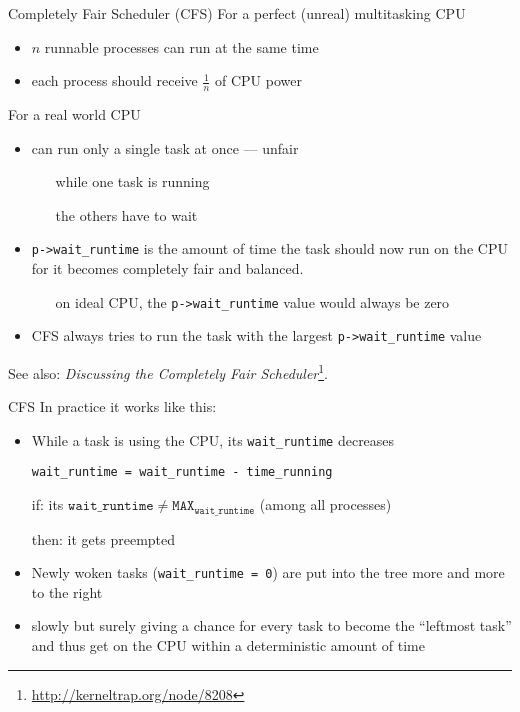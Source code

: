 \begin{frame}{Completely Fair Scheduler (CFS)}
  For a perfect (unreal) multitasking CPU
  \begin{itemize}
  \item $n$ runnable processes can run at the same time
  \item each process should receive $\frac{1}{n}$ of CPU power
  \end{itemize}
  
  For a real world CPU
  \begin{itemize}
  \item can run only a single task at once --- unfair
    \begin{itemize}
    \item[\good] while one task is running
    \item[\textcolor{red}{\bad}] the others have to wait
    \end{itemize}
  \item \texttt{p->wait\_runtime} is the amount of time the task should now run on the CPU
    for it becomes completely fair and balanced.
    \begin{itemize}
    \item[\good] on ideal CPU, the \texttt{p->wait\_runtime} value would always be zero
    \end{itemize}
  \item CFS always tries to run the task with the largest \texttt{p->wait\_runtime} value
  \end{itemize}
\end{frame}

See also: \emph{Discussing the Completely Fair
  Scheduler}\footnote{\url{http://kerneltrap.org/node/8208}}.

\begin{frame}{CFS}
  In practice it works like this:
  \begin{itemize}
  \item While a task is using the CPU, its \texttt{wait\_runtime} decreases
    \begin{center}
      \texttt{wait\_runtime = wait\_runtime - time\_running}
    \end{center}
  \item[if:] its $\mathtt{wait\_runtime \ne MAX_{wait\_runtime}}$
    (among all processes)
  \item[then:] it gets preempted
  \item Newly woken tasks (\texttt{wait\_runtime = 0}) are put into the tree more and more
    to the right
  \item slowly but surely giving a chance for every task to become the ``leftmost task'' and
    thus get on the CPU within a deterministic amount of time
  \end{itemize}
\end{frame}

